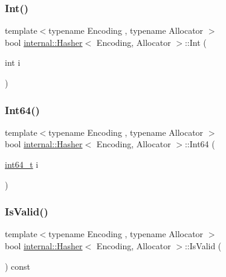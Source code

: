 \subsubsection{\texorpdfstring{Int()}{Int()}}
{\footnotesize\ttfamily template$<$typename Encoding , typename Allocator $>$ \\
bool \hyperlink{classinternal_1_1Hasher}{internal\+::\+Hasher}$<$ Encoding, Allocator $>$\+::Int (\begin{DoxyParamCaption}\item[{int}]{i }\end{DoxyParamCaption})\hspace{0.3cm}{\ttfamily [inline]}}

\mbox{\label{classinternal_1_1Hasher_ae0579cd54b3c545f77452543793b9a97}} 
\subsubsection{\texorpdfstring{Int64()}{Int64()}}
{\footnotesize\ttfamily template$<$typename Encoding , typename Allocator $>$ \\
bool \hyperlink{classinternal_1_1Hasher}{internal\+::\+Hasher}$<$ Encoding, Allocator $>$\+::Int64 (\begin{DoxyParamCaption}\item[{\hyperlink{stdint_8h_a414156feea104f8f75b4ed9e3121b2f6}{int64\+\_\+t}}]{i }\end{DoxyParamCaption})\hspace{0.3cm}{\ttfamily [inline]}}

\mbox{\label{classinternal_1_1Hasher_ae09fee05c56194031e8af94a1b1be145}} 
\subsubsection{\texorpdfstring{Is\+Valid()}{IsValid()}}
{\footnotesize\ttfamily template$<$typename Encoding , typename Allocator $>$ \\
bool \hyperlink{classinternal_1_1Hasher}{internal\+::\+Hasher}$<$ Encoding, Allocator $>$\+::Is\+Valid (\begin{DoxyParamCaption}{ }\end{DoxyParamCaption}) const\hspace{0.3cm}{\ttfamily [inline]}}

